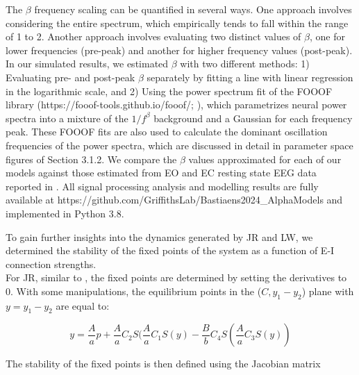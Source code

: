 \documentclass[12pt,twoside]{article}
\begin{document}
The $\beta$ frequency scaling can be quantified in several ways. One approach involves considering the entire spectrum, which empirically tends to fall within the range of 1 to 2. Another approach involves evaluating two distinct values of $\beta$, one for lower frequencies (pre-peak) and another for higher frequency values (post-peak). In our simulated results, we estimated $\beta$ with two different methods: 1) Evaluating pre- and post-peak $\beta$ separately by fitting a line with linear regression in the logarithmic scale, and 2) Using the power spectrum fit of the FOOOF library (https://fooof-tools.github.io/fooof/; \citealp{donoghue2020parameterizing}), which parametrizes neural power spectra into a mixture of the $1/f^\beta$ background and a Gaussian for each frequency peak. These FOOOF fits are also used to calculate the dominant oscillation frequencies of the power spectra, which are discussed in detail in parameter space figures of Section 3.1.2. We compare the $\beta$ values approximated for each of our models against those estimated from EO and EC resting state EEG data reported in \citet{muthukumaraswamy20181}. All signal processing analysis and modelling results are fully available at https://github.com/GriffithsLab/Bastiaens2024\_AlphaModels and implemented in Python 3.8. 

To gain further insights into the dynamics generated by JR and LW, we determined the stability of the fixed points of the system as a function of E-I connection strengths. \\
For JR, similar to \citet{grimbert2006bifurcation}, the fixed points are determined by setting the derivatives to 0. With some manipulations, the equilibrium points in the ($C, y_1 - y_2$) plane with $y = y_1 - y_2$ are equal to:

\begin{equation}
    y = \frac{A}{a}p + \frac{A}{a}C_2S(\frac{A}{a}C_1S(y) - \frac{B}{b}C_4S(\frac{A}{a}C_3S(y))
\end{equation}

The stability of the fixed points is then defined using the Jacobian matrix
\end{document}
